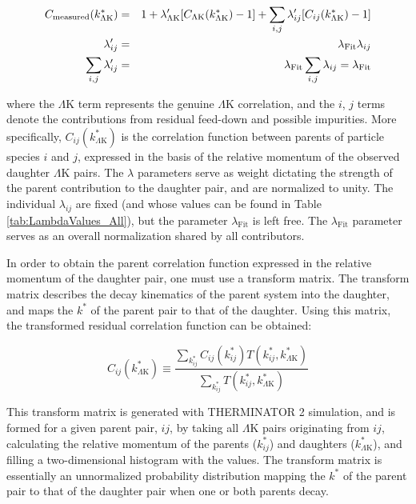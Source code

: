 \documentclass[ALICE,manyauthors]{cernphprep}
\newcommand{\kstar}{$k^{*}$\xspace}
\newcommand{\LamK}{$\Lambda$K\xspace}
\begin{document}
\begin{eqnarray}
\label{eqn:Residuals} 
 C_{\mathrm{measured}}(k^{*}_{\Lambda\mathrm{K}}) &=& 1 + \lambda'_{\Lambda\mathrm{K}}[C_{\Lambda\mathrm{K}}(k^{*}_{\Lambda\mathrm{K}}) - 1] + \sum\limits_{i,j}  \lambda'_{ij}[C_{ij}(k^{*}_{\Lambda\mathrm{K}})-1] \\
 \lambda_{ij}' &=& \lambda_{\mathrm{Fit}}\lambda_{ij} \notag \\
 \sum\limits_{i,j}\lambda_{ij}' &=&  \lambda_{\mathrm{Fit}}\sum\limits_{i,j}\lambda_{ij} = \lambda_{\mathrm{Fit}} \notag
\end{eqnarray}

where the \LamK term represents the genuine \LamK correlation, and the $i$, $j$ terms denote the contributions from residual feed-down and possible impurities.
More specifically, $C_{ij}(k^{*}_{\Lambda\mathrm{K}})$ is the correlation function between parents of particle species $i$ and $j$, expressed in the basis of the relative momentum of the observed daughter \LamK pairs.  
The $\lambda$ parameters serve as weight dictating the strength of the parent contribution to the daughter pair, and are normalized to unity.
The individual $\lambda_{ij}$ are fixed (and whose values can be found in Table \ref{tab:LambdaValues_All}), but the parameter $\lambda_{\mathrm{Fit}}$ is left free.
The $\lambda_{\mathrm{Fit}}$ parameter serves as an overall normalization shared by all contributors.

In order to obtain the parent correlation function expressed in the relative momentum of the daughter pair, one must use a transform matrix.
The transform matrix describes the decay kinematics of the parent system into the daughter, and maps the \kstar of the parent pair to that of the daughter.
Using this matrix, the transformed residual correlation function can be obtained:


\begin{equation}
  C_{ij}(k^{*}_{\Lambda\mathrm{K}}) \equiv \frac{\sum\limits_{k^{*}_{ij}} C_{ij}\left(k^{*}_{ij}\right) T\left(k^{*}_{ij},k^{*}_{\Lambda\mathrm{K}}\right)}{\sum\limits_{k^{*}_{ij}} T\left(k^{*}_{ij},k^{*}_{\Lambda\mathrm{K}}\right)}
\label{eqn:ResidualsTransform}
\end{equation}


This transform matrix is generated with THERMINATOR 2 \cite{Chojnacki:2011hb} simulation, and is formed for a given parent pair, $ij$, by taking all \LamK pairs originating from $ij$, calculating the relative momentum of the parents ($k^{*}_{ij}$) and daughters ($k^{*}_{\Lambda\mathrm{K}}$), and filling a two-dimensional histogram with the values. 
The transform matrix is essentially an unnormalized probability distribution mapping the \kstar of the parent pair to that of the daughter pair when one or both parents decay.
\end{document}

